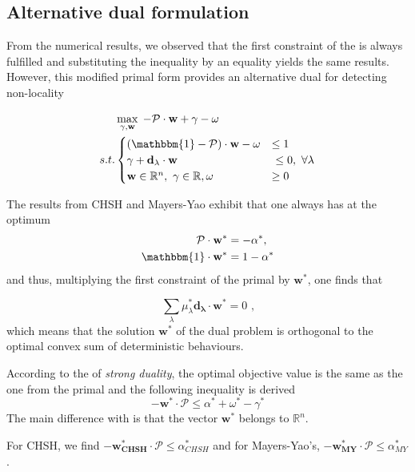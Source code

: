 \subsection{Alternative dual formulation }

From the numerical results, we observed that the first constraint of the
 is always fulfilled and substituting the inequality by an equality
yields the same results. However, this modified primal form provides an alternative
dual for detecting non-locality

\begin{equation}\label{eq:dual2}
    \begin{aligned}
        & \max_{\gamma,\mathbf{w}} \; - \mathcal{P}\cdot \mathbf{w} + 
        \gamma - \omega  \\
    s.t. &
        \begin{cases}
            (\mathbbm{1} - \mathcal{P}) \cdot \mathbf{w}  - \omega & \leq  1\\
            \gamma + \mathbf{d_\lambda} \cdot \mathbf{w} &\ \leq  0, \ \forall
            \lambda\\
            \mathbf{w} \in \mathbb{R}^n ,\ \gamma \in \mathbb{R}, \omega & \geq 0
        \end{cases}
    \end{aligned}
\end{equation}


The results from CHSH and Mayers-Yao exhibit that one always has at the optimum
\begin{equation*}
    \begin{aligned}
        \mathcal{P} \cdot \mathbf{w}^* & =  -\alpha^*, \\
        \mathbbm{1} \cdot \mathbf{w}^* & =  1 - \alpha^*
    \end{aligned}
\end{equation*}
and thus, multiplying the first constraint of the primal by $\mathbf{w}^*$, one
finds that

\begin{equation}
    \sum_\lambda \mu^*_\lambda \mathbf{d_\lambda} \cdot \mathbf{w}^* = 0 \text{ ,}
\end{equation}
which means that the solution $\mathbf{w}^*$ of the dual problem is
orthogonal to the optimal convex sum of deterministic behaviours. 

According to the  of \emph{strong duality}, the optimal 
objective value is the same as the one from the primal and the following 
inequality is derived
\begin{equation*}
        -\mathbf{w}^* \cdot \mathcal{P} \leq \alpha^* + \omega^* - \gamma^*
\end{equation*}
The main difference with  is that the vector $\mathbf{w^*}$ belongs to $\mathbb{R}^n$.

For CHSH, we find $-\mathbf{w^* _{CHSH}}\cdot \mathcal{P} \leq \alpha^*_{CHSH} $ and
for Mayers-Yao's, $-\mathbf{w^*_{MY}} \cdot \mathcal{P} \leq  \alpha^*_{MY} $. 
